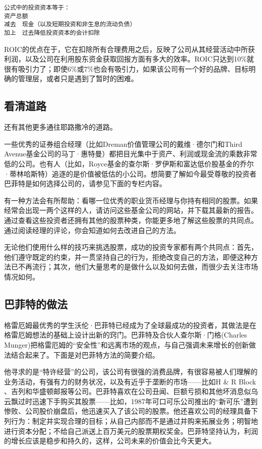 \documentclass[12pt,oneside]{book}
\begin{document}
\begin{verbatim}
公式中的投资资本等于：
资产总额
减去　现金（以及短期投资和非生息的流动负债）
加上　过去降低投资资本的会计扣除
\end{verbatim}

ROIC的优点在于，它在扣除所有合理费用之后，反映了公司从其经营活动中所获利润，以及公司在利用股东资金获取回报方面有多大的效率。ROIC只达到10\%就很有吸引力了；即使6\%或7\%也会有吸引力，如果该公司有一个好的品牌、目标明确的管理层，或者只是遇到了暂时的困难。

\subsection{看清道路}
还有其他更多通往耶路撒冷的道路。

一些优秀的证券组合经理（比如Dreman价值管理公司的戴维·德尔门和Third Avenue基金公司的马丁·惠特曼）都把目光集中于资产、利润或现金流的乘数非常低的公司。也有人（比如，Royce基金的查尔斯·罗伊斯和富达低价股基金的乔尔·蒂林哈斯特）追逐的是价值被低估的小公司。想简要了解如今最受尊敬的投资者巴菲特是如何选择公司的，请参见下面的专栏内容。

有一种方法会有所帮助：看哪一位优秀的职业货币经理与你持有相同的股票。如果经常会出现一两个这样的人，请访问这些基金公司的网站，并下载其最新的报告。通过查看这些投资者还拥有其他的股票种类，你能更多地了解这些股票的共同点。通过阅读经理的评论，你会知道如何去改进自己的方法。

无论他们使用什么样的技巧来挑选股票，成功的投资专家都有两个共同点：首先，他们遵守既定的约束，并一贯坚持自己的行为，拒绝改变自己的方法，即便这种方法已不再流行；其次，他们大量思考的是做什么以及如何去做，而很少去关注市场情况如何。


\subsection{巴菲特的做法}
格雷厄姆最优秀的学生沃伦·巴菲特已经成为了全球最成功的投资者，其做法是在格雷厄姆想法的基础上设计出新的窍门。巴菲特及合伙人查尔斯·门格(Charles Munger)把格雷厄姆的“安全性”和远离市场的观点，与自己强调未来增长的创新做法结合起来了。下面是对巴菲特方法的简要介绍。

他寻求的是“特许经营”的公司，该公司有很强的消费品牌，有很容易被人们理解的业务活动，有强有力的财务状况，以及有近乎于垄断的市场——比如H \& R Block 、吉列和华盛顿邮报等公司。巴菲特喜欢在公司丑闻、巨额亏损和其他坏消息似乌云飘过时迅速下手购买其股票——比如，1987年可口可乐公司推出的“新可乐”遭到惨败、公司股价崩盘后，他迅速买入了该公司的股票。他还喜欢公司的经理具备下列行为：制定并实现合理的目标；从自己内部而不是通过并购来拓展业务；明智地进行资本分配；不给自己派送上百万美元的股票期权奖金。巴菲特坚持认为，利润的增长应该是稳步和持久的，这样，公司未来的价值会比今天更大。
\end{document}
